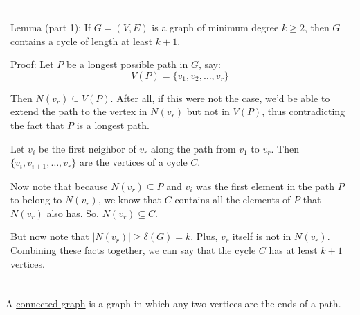 \documentclass{book}
\newcommand{\hOneOld}{%
   \color{Black}%
   \fontsize{14}{14}\selectfont%
}
\newcommand{\exOneOldd}{%
   \color{Purple}%
   \fontsize{14}{14}\selectfont%
}
\newcommand{\exPOldd}{%
   \color{VioletRed}%
   \fontsize{12}{12}\selectfont%
}
\newenvironment{myConstrict}{%
   \begin{adjustwidth}{2.5em}{2.5em}%
}{%
   \end{adjustwidth}%
}
\newcommand{\udefine}[1]{%
   \setulcolor{Red}%
   \setul{0.14em}{0.07em}%
   \ul{#1}%
}
\newcommand{\uuline}[2][.]{%
{\vphantom{a}\color{#1}%
\rlap{\rule[-0.18em]{\widthof{#2}}{0.06em}}%
\rlap{\rule[-0.32em]{\widthof{#2}}{0.06em}}}%
#2}
\newenvironment{myClosureDeprecated}[2][.]{%
   \color{#1}%
   \begin{tabular}{|p{#2in}|} \hline \\%
}{%
   \\ \\ \hline \end{tabular}%
}
\newcommand{\retTwo}{\hfill\bigbreak}
\begin{document}
\exOneOldd
\begin{center}
\begin{myClosureDeprecated}{5.5}
   \uuline{Lemma (part 1)}: If $G = (V, E)$ is a graph of minimum degree
   $k \geq 2$, then $G$ contains a cycle of length at least
   $k + 1$.

   {\exPOldd \begin{myConstrict}
      Proof: Let $P$ be a longest possible path in $G$, say:
      \[V(P) = \{v_1, v_2, \ldots, v_r\}\]

      Then $N(v_r) \subseteq V(P)$. After all, if this were not 
      the case, we'd be able to extend the path to the vertex in 
      $N(v_r)$ but not in $V(P)$, thus contradicting the fact that
      $P$ is a longest path. \retTwo

      Let $v_i$ be the first neighbor of $v_r$ along the path from
      $v_1$ to $v_r$. Then $\{v_i, v_{i+1}, \ldots, v_r\}$ are the
      vertices of a cycle $C$. \retTwo

      Now note that because $N(v_r) \subseteq P$ and $v_i$ was
      the first element in the path $P$ to belong to $N(v_r)$, 
      we know that $C$ contains all the elements of $P$ that 
      $N(v_r)$ also has. So, $N(v_r) \subseteq C$. \retTwo

      But now note that $\lvert N(v_r) \rvert \geq \delta(G)=k$. Plus,
      $v_r$ itself is not in $N(v_r)$. Combining these facts together,
      we can say that the cycle $C$ has at least $k + 1$ vertices.
   \end{myConstrict}}

   \uuline{Lemma (part 2)}: The cycle length $k+1$ is the longest 
   we can guarentee based on the minimum degree of the graph being $k$.

   {\exPOldd \begin{myConstrict}
      Proof: Take the graph $K_{k+1}$ which has a minimum degree $k$. 
      \newline
      Obviously, the longest cycle in $K_{k+1}$ is the cycle containing
      all $k+1$ elements of $K_{k+1}$. Thus, we have shown that there
      are graphs with minimum degree $k$ which don't have cycles of
      length greater than \newline $k + 1$.
   \end{myConstrict}} 
\end{myClosureDeprecated}
\end{center}
\retTwo

\hOneOld
A \udefine{connected graph} is a graph in which any two vertices
are the ends of a path. \retTwo
\end{document}
